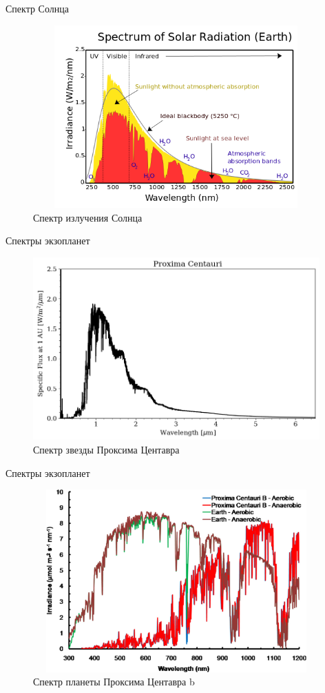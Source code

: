 \documentclass[
]{beamer}
\begin{document}
	\begin{frame}{Спектр Солнца}
		\begin{figure}[H]
			\centering
			\includegraphics[width=11cm, height=7cm]{solar.png}
			\caption{Спектр излучения Солнца}
		\end{figure}
	\end{frame}

	\begin{frame}{Спектры экзопланет}
		\begin{figure}[H]
			\centering
			\includegraphics[width=11cm, height=7cm]{ProxCenSpec.png}
			\caption{Спектр звезды Проксима Центавра}
		\end{figure}
	\end{frame}

	\begin{frame}{Спектры экзопланет}
		\begin{figure}[H]
			\centering
			\includegraphics[width=11cm, height=7cm]{proxima_b_spec.jpeg}
			\caption{Спектр планеты Проксима Центавра b}
		\end{figure}
	\end{frame}
\end{document}

